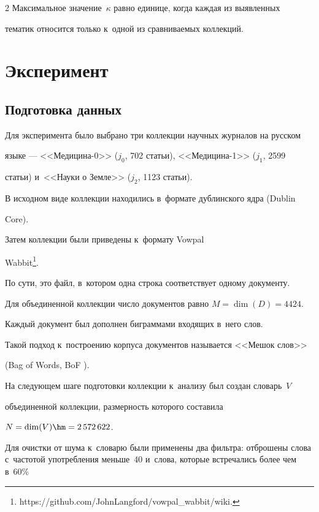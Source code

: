 \begin{multicols}{2}
    Максимальное значение~$\kappa$ равно единице, когда каждая из выявленных 


тематик относится только к~одной из сравниваемых коллекций.


    


    \section{Эксперимент}


    


    \subsection{Подготовка данных}\label{sec:data}


    Для эксперимента было выбрано три коллекции научных журналов на русском 


языке --- <<\mbox{Ме\-ди\-ци\-на-0}>> ($j_0$, 702 статьи), <<Медицина-1>> ($j_1$, 2599 


статьи) и~<<Науки о Земле>> ($j_2$, 1123 статьи). 





    В исходном виде коллекции находились в~формате дублинского ядра (Dublin 


Core).


    Затем коллекции были приведены к~формату Vowpal 


Wabbit\footnote{{\sf https://github.com/JohnLangford/vowpal\_wabbit/wiki.}}.


    По сути, это файл, в~котором одна строка соответствует одному документу.


    Для объединенной коллекции число документов равно $M = \dim(D) = 4424$.


    Каждый документ был дополнен биграммами входящих в~него слов.


       Такой подход к~построению корпуса документов называется <<Мешок слов>>  


(Bag of Words, BoF \cite{harris1954distributional}).


    На следующем шаге подготовки коллекции к~анализу был создан словарь~$V$ 


объединенной коллекции,  размерность которого составила 


$N = \mathrm{dim}(V) \hm= 2\, 572\, 622 $.


       Для очистки от шума к~словарю были применены два фильтра: отброшены слова с~частотой употребления меньше~40 и~слова, которые встречались более чем в~60\% 



\end{multicols}
